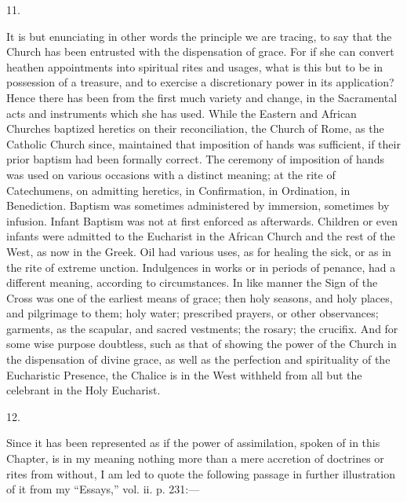11.

It is but enunciating in other words the principle we
are tracing, to say that the Church has been entrusted
with the dispensation of grace. For if she can convert
heathen appointments into spiritual rites and usages,
what is this but to be in possession of a treasure, and
to exercise a discretionary power in its application?
Hence there has been from the first much variety and
change, in the Sacramental acts and instruments which she
has used. While the Eastern and African Churches baptized
heretics on their reconciliation, the Church of Rome, as
the Catholic Church since, maintained that imposition of
hands was sufficient, if their prior baptism had been
formally correct. The ceremony of imposition of hands was
used on various occasions with a distinct meaning; at the
rite of Catechumens, on admitting heretics, in
Confirmation, in Ordination, in Benediction. Baptism was
sometimes administered by immersion, sometimes by
infusion. Infant Baptism was not at first enforced as
afterwards. Children or even infants were admitted to the
Eucharist in the African Church and the rest of the West,
as now in the Greek. Oil had various uses, as for healing
the sick, or as in the rite of extreme unction.
Indulgences in works or in periods of penance, had a
different meaning, according to circumstances. In like
manner the Sign of the Cross was one of the earliest
means of grace; then holy seasons, and holy places, and
pilgrimage to them; holy water; prescribed prayers, or
other observances; garments, as the scapular, and
sacred vestments; the rosary; the crucifix. And for some
wise purpose doubtless, such as that of showing the power
of the Church in the dispensation of divine grace, as
well as the perfection and spirituality of the
Eucharistic Presence, the Chalice is in the West withheld
from all but the celebrant in the Holy Eucharist.

12.

Since it has been represented as if the power of
assimilation, spoken of in this Chapter, is in my meaning
nothing more than a mere accretion of doctrines or rites
from without, I am led to quote the following passage in
further illustration of it from my ``Essays,''
vol. ii. p. 231:—

